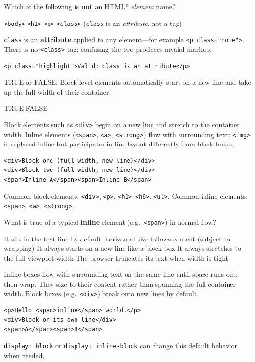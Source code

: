 \question[4]
Which of the following is \textbf{not} an HTML5 \emph{element} name?
\begin{choices}
  \choice \texttt{<body>}
  \choice \texttt{<h1>}
  \choice \texttt{<p>}
  \CorrectChoice \texttt{<class>} (\texttt{class} is an \emph{attribute}, not a tag)
\end{choices}
\begin{solution}
  \texttt{class} is an \textbf{attribute} applied to any element---for example \texttt{<p class="note">}. There is no \texttt{<class>} tag; confusing the two produces invalid markup.
\begin{lstlisting}[style=htmlinline]
<p class="highlight">Valid: class is an attribute</p>
\end{lstlisting}
\end{solution}

\question[4]
TRUE or FALSE: Block-level elements automatically start on a new line and take up the full width of their container.
\begin{choices}
  \CorrectChoice TRUE
  \choice FALSE
\end{choices}
\begin{solution}
  Block elements such as \texttt{<div>} begin on a new line and stretch to the container width. Inline elements (\texttt{<span>}, \texttt{<a>}, \texttt{<strong>}) flow with surrounding text; \texttt{<img>} is replaced inline but participates in line layout differently from block boxes.
\begin{lstlisting}[style=htmlinline]
<div>Block one (full width, new line)</div>
<div>Block two (full width, new line)</div>
<span>Inline A</span><span>Inline B</span>
\end{lstlisting}
  Common block elements: \texttt{<div>}, \texttt{<p>}, \texttt{<h1>}--\texttt{<h6>}, \texttt{<ul>}. Common inline elements: \texttt{<span>}, \texttt{<a>}, \texttt{<strong>}.
\end{solution}

\question[4]
What is true of a typical \textbf{inline} element (e.g.\ \texttt{<span>}) in normal flow?
\begin{choices}
  \CorrectChoice It sits in the text line by default; horizontal size follows content (subject to wrapping)
  \choice It always starts on a new line like a block box
  \choice It always stretches to the full viewport width
  \choice The browser truncates its text when width is tight
\end{choices}
\begin{solution}
  Inline boxes flow with surrounding text on the same line until space runs out, then wrap. They size to their content rather than spanning the full container width. Block boxes (e.g.\ \texttt{<div>}) break onto new lines by default.
\begin{lstlisting}[style=htmlinline]
<p>Hello <span>inline</span> world.</p>
<div>Block on its own line</div>
<span>A</span><span>B</span>
\end{lstlisting}
  \texttt{display: block} or \texttt{display: inline-block} can change this default behavior when needed.
\end{solution}


